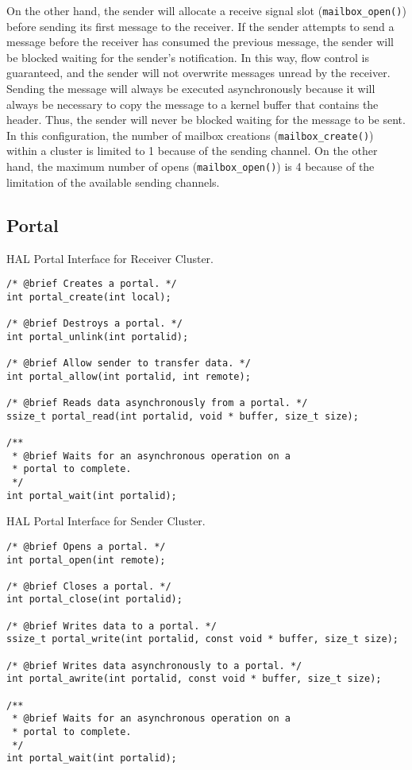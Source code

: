 		On the other hand, the sender will allocate a receive signal slot (\texttt{mailbox\_open()})
		before sending its first message to the receiver.
		If the sender attempts to send a message before the receiver has consumed
		the previous message, the sender will be blocked waiting for the sender's notification.
		In this way, flow control is guaranteed, and the sender will not overwrite
		messages unread by the receiver.
		Sending the message will always be executed asynchronously
		because it will always be necessary to copy the message to
		a kernel buffer that contains the header.
		Thus, the sender will never be blocked waiting for the message to be sent.
		In this configuration, the number of mailbox creations (\texttt{mailbox\_create()})
		within a cluster is limited to 1 because of the \cnoc sending channel.
		On the other hand, the maximum number of opens (\texttt{mailbox\_open()}) is
		4 because of the limitation of the available \dnoc sending channels.

	\subsection{Portal}

\begin{listing}[t]
\caption{HAL Portal Interface for Receiver Cluster.}
\label{code:portal-receiver}
\begin{verbatim}
/* @brief Creates a portal. */
int portal_create(int local);

/* @brief Destroys a portal. */
int portal_unlink(int portalid);

/* @brief Allow sender to transfer data. */
int portal_allow(int portalid, int remote);

/* @brief Reads data asynchronously from a portal. */
ssize_t portal_read(int portalid, void * buffer, size_t size);

/**
 * @brief Waits for an asynchronous operation on a
 * portal to complete.
 */
int portal_wait(int portalid);
\end{verbatim}
\end{listing}

\begin{listing}[t]
\caption{HAL Portal Interface for Sender Cluster.}
\label{code:portal-sender}
\begin{verbatim}
/* @brief Opens a portal. */
int portal_open(int remote);

/* @brief Closes a portal. */
int portal_close(int portalid);

/* @brief Writes data to a portal. */
ssize_t portal_write(int portalid, const void * buffer, size_t size);

/* @brief Writes data asynchronously to a portal. */
int portal_awrite(int portalid, const void * buffer, size_t size);

/**
 * @brief Waits for an asynchronous operation on a
 * portal to complete.
 */
int portal_wait(int portalid);
\end{verbatim}
\end{listing}


